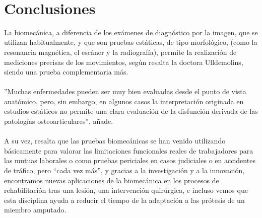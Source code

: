 \documentclass{article}
\begin{document}
\\

\section{Conclusiones}

La biomecánica, a diferencia de los exámenes de diagnóstico por la imagen, que se utilizan habitualmente, y que son pruebas estáticas, de tipo morfológico, (como la resonancia magnética, el escáner y la radiografía), permite la realización de mediciones precisas de los movimientos, según resalta la doctora Ulldemolins, siendo una prueba complementaria más.\\
\\
”Muchas enfermedades pueden ser muy bien evaluadas desde el punto de vista anatómico, pero, sin embargo, en algunos casos la interpretación originada en estudios estáticos no permite una clara evaluación de la disfunción derivada de las patologías osteoarticulares”, añade.\\
\\
A su vez, resalta que las pruebas biomecánicas se han venido utilizando básicamente para valorar las limitaciones funcionales reales de trabajadores para las mutuas laborales o como pruebas periciales en casos judiciales o en accidentes de tráfico, pero “cada vez más”, y gracias a la investigación y a la innovación, encontramos nuevas aplicaciones de la biomecánica en los procesos de rehabilitación tras una lesión, una intervención quirúrgica, e incluso vemos que esta disciplina ayuda a reducir el tiempo de la adaptación a las prótesis de un miembro amputado.
\\



\end{document}
